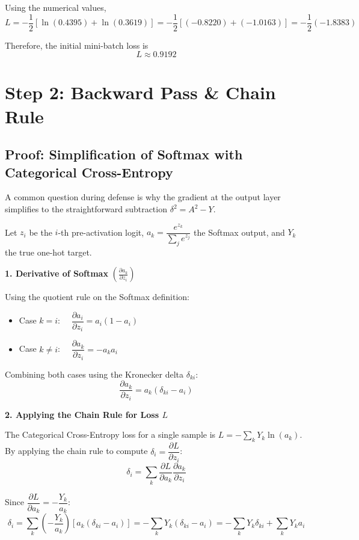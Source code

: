 \documentclass[11pt]{article}
\begin{document}
Using the numerical values,
\[
L = -\frac{1}{2}\left[\ln(0.4395) + \ln(0.3619)\right] = -\frac{1}{2}\left[(-0.8220) + (-1.0163)\right] = -\frac{1}{2}(-1.8383)
\]

Therefore, the initial mini-batch loss is
\[
\boxed{L \approx 0.9192}
\]

\newpage
\section{Step 2: Backward Pass \& Chain Rule}

\subsection{Proof: Simplification of Softmax with Categorical Cross-Entropy}

A common question during defense is why the gradient at the output layer simplifies to the straightforward subtraction $\delta^2 = A^2 - Y$.

Let $z_i$ be the $i$-th pre-activation logit, $a_k = \dfrac{e^{z_k}}{\sum_j e^{z_j}}$ the Softmax output, and $Y_k$ the true one-hot target.

\textbf{1. Derivative of Softmax} $\left(\frac{\partial a_k}{\partial z_i}\right)$

Using the quotient rule on the Softmax definition:
\begin{itemize}
    \item Case $k = i$: $\quad \dfrac{\partial a_i}{\partial z_i} = a_i(1-a_i)$
    \item Case $k \neq i$: $\quad \dfrac{\partial a_k}{\partial z_i} = -a_k a_i$
\end{itemize}

Combining both cases using the Kronecker delta $\delta_{ki}$:
\[
\frac{\partial a_k}{\partial z_i} = a_k(\delta_{ki}-a_i)
\]

\textbf{2. Applying the Chain Rule for Loss $L$}

The Categorical Cross-Entropy loss for a single sample is $L = -\sum_k Y_k \ln(a_k)$. By applying the chain rule to compute $\delta_i = \dfrac{\partial L}{\partial z_i}$:
\[
\delta_i = \sum_k \frac{\partial L}{\partial a_k}\frac{\partial a_k}{\partial z_i}
\]

Since $\dfrac{\partial L}{\partial a_k} = -\dfrac{Y_k}{a_k}$:
\[
\delta_i = \sum_k \left(-\frac{Y_k}{a_k}\right)\left[a_k(\delta_{ki}-a_i)\right] = -\sum_k Y_k(\delta_{ki}-a_i) = -\sum_k Y_k \delta_{ki} + \sum_k Y_k a_i
\]
\end{document}
